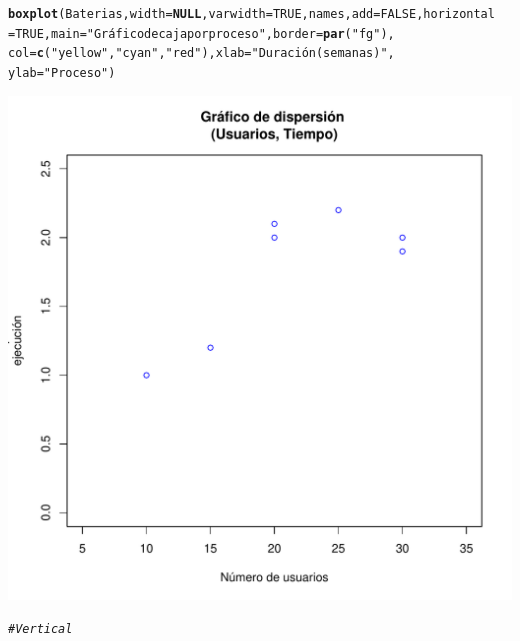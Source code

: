 \documentclass[12pt,letterpaper]{article}\usepackage[]{graphicx}\usepackage[]{color}
\makeatletter
\def\maxwidth{ %
  \ifdim\Gin@nat@width>\linewidth
    \linewidth
  \else
    \Gin@nat@width
  \fi
}
\newcommand{\hlnum}[1]{\textcolor[rgb]{0.686,0.059,0.569}{#1}}%
\newcommand{\hlstr}[1]{\textcolor[rgb]{0.192,0.494,0.8}{#1}}%
\newcommand{\hlcom}[1]{\textcolor[rgb]{0.678,0.584,0.686}{\textit{#1}}}%
\newcommand{\hlstd}[1]{\textcolor[rgb]{0.345,0.345,0.345}{#1}}%
\newcommand{\hlkwa}[1]{\textcolor[rgb]{0.161,0.373,0.58}{\textbf{#1}}}%
\newcommand{\hlkwc}[1]{\textcolor[rgb]{0.333,0.667,0.333}{#1}}%
\newcommand{\hlkwd}[1]{\textcolor[rgb]{0.737,0.353,0.396}{\textbf{#1}}}%
\newenvironment{kframe}{%
 \def\at@end@of@kframe{}%
 \ifinner\ifhmode%
  \def\at@end@of@kframe{\end{minipage}}%
  \begin{minipage}{\columnwidth}%
 \fi\fi%
 \def\FrameCommand##1{\hskip\@totalleftmargin \hskip-\fboxsep
 \colorbox{shadecolor}{##1}\hskip-\fboxsep
     \hskip-\linewidth \hskip-\@totalleftmargin \hskip\columnwidth}%
 \MakeFramed {\advance\hsize-\width
   \@totalleftmargin\z@ \linewidth\hsize
   \@setminipage}}%
 {\par\unskip\endMakeFramed%
 \at@end@of@kframe}
\newenvironment{knitrout}{}{} %
\makeatother
\begin{document}
\begin{enumerate}
\begin{knitrout}
\begin{kframe}
\begin{alltt}
\hlkwd{boxplot}\hlstd{(Baterias,} \hlkwc{width}\hlstd{=}\hlkwa{NULL}\hlstd{,} \hlkwc{varwidth}\hlstd{=}\hlnum{TRUE}\hlstd{,names,} \hlkwc{add}\hlstd{=} \hlnum{FALSE}\hlstd{,} \hlkwc{horizontal}
        \hlstd{=} \hlnum{TRUE}\hlstd{,} \hlkwc{main}\hlstd{=}\hlstr{"Gráfico de caja por proceso"}\hlstd{,} \hlkwc{border}\hlstd{=}\hlkwd{par}\hlstd{(}\hlstr{"fg"}\hlstd{),}
        \hlkwc{col}\hlstd{=}\hlkwd{c}\hlstd{(}\hlstr{"yellow"}\hlstd{,} \hlstr{"cyan"}\hlstd{,} \hlstr{"red"}\hlstd{),} \hlkwc{xlab} \hlstd{=} \hlstr{"Duración (semanas)"}\hlstd{,}
        \hlkwc{ylab}\hlstd{=}\hlstr{"Proceso"}\hlstd{)}
\end{alltt}
\end{kframe}
\includegraphics[width=\maxwidth]{figure/unnamed-chunk-10-1} 

\end{knitrout}

\begin{knitrout}
\color{fgcolor}\begin{kframe}
\begin{alltt}
\hlcom{# Vertical}


\end{alltt}
\end{kframe}
\end{knitrout}
\end{enumerate}
\end{document}
